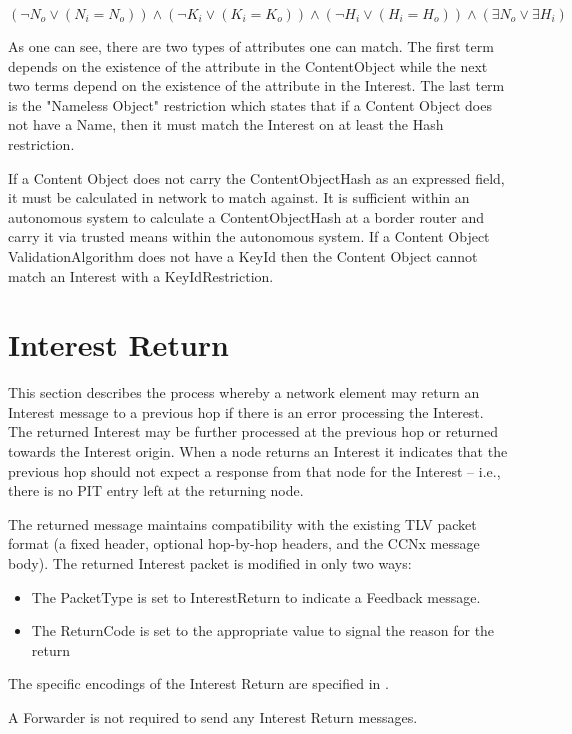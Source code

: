 \documentclass[12pt]{article}
\begin{document}
$$
(\neg N_o \lor (N_i=N_o)) \land (\neg K_i \lor (K_i=K_o)) \land (\neg H_i \lor (H_i=H_o)) \land (\exists N_o \lor \exists H_i)
$$

As one can see, there are two types of attributes one can match.  The
first term depends on the existence of the attribute in the
ContentObject while the next two terms depend on the existence of the
attribute in the Interest.  The last term is the "Nameless Object"
restriction which states that if a Content Object does not have a
Name, then it must match the Interest on at least the Hash
restriction.

If a Content Object does not carry the ContentObjectHash as an
expressed field, it must be calculated in network to match against.
It is sufficient within an autonomous system to calculate a
ContentObjectHash at a border router and carry it via trusted means
within the autonomous system.  If a Content Object
ValidationAlgorithm does not have a KeyId then the Content Object
cannot match an Interest with a KeyIdRestriction.

\section{Interest Return}
This section describes the process whereby a network element may
return an Interest message to a previous hop if there is an error
processing the Interest.  The returned Interest may be further
processed at the previous hop or returned towards the Interest
origin.  When a node returns an Interest it indicates that the
previous hop should not expect a response from that node for the
Interest -- i.e., there is no PIT entry left at the returning node.

The returned message maintains compatibility with the existing TLV
packet format (a fixed header, optional hop-by-hop headers, and the
CCNx message body).  The returned Interest packet is modified in only
two ways:

\begin{itemize}
\item  The PacketType is set to InterestReturn to indicate a Feedback
   message.

\item  The ReturnCode is set to the appropriate value to signal the
   reason for the return
\end{itemize}

The specific encodings of the Interest Return are specified in \cite{messages}.

A Forwarder is not required to send any Interest Return messages.
\end{document}

